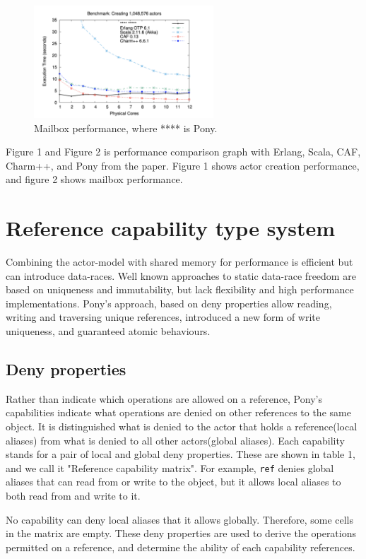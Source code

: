 \documentclass{article}
\begin{document}
\begin{multicols}{2}
\begin{figure}
\centering 		\includegraphics[width=0.6\textwidth]{b}
\caption{Mailbox performance, where **** is Pony. \cite{type-proof-paper}}
\end{figure}


Figure 1 and Figure 2 is performance comparison graph with Erlang, Scala, CAF, Charm++, and Pony from the paper\cite{type-proof-paper}.
Figure 1 shows actor creation performance, and figure 2 shows mailbox performance.


\section{Reference capability type system}
Combining the actor-model with shared memory for performance is efficient but can introduce data-races. Well known approaches to static data-race freedom are based on uniqueness and immutability, but lack flexibility and high performance implementations. Pony's approach, based on deny properties allow reading, writing and traversing unique references, introduced a new form of write uniqueness, and guaranteed atomic behaviours.

\subsection{Deny properties}
Rather than indicate which operations are allowed on a reference, Pony's capabilities indicate what operations are denied on other references to the same object. It is distinguished what is denied to the actor that holds a reference(local aliases) from what is denied to all other actors(global aliases). Each capability stands for a pair of local and global deny properties.
These are shown in table 1\cite{type-proof-paper}, and we call it "Reference capability matrix". For example, \texttt{ref} denies global aliases that can read from or write to the object, but it allows local aliases to both read from and write to it.

No capability can deny local aliases that it allows globally.  Therefore, some cells in the matrix are empty.
These deny properties are used to derive the operations permitted on a reference, and determine the ability of each capability references. \\


\end{multicols}
\end{document}
